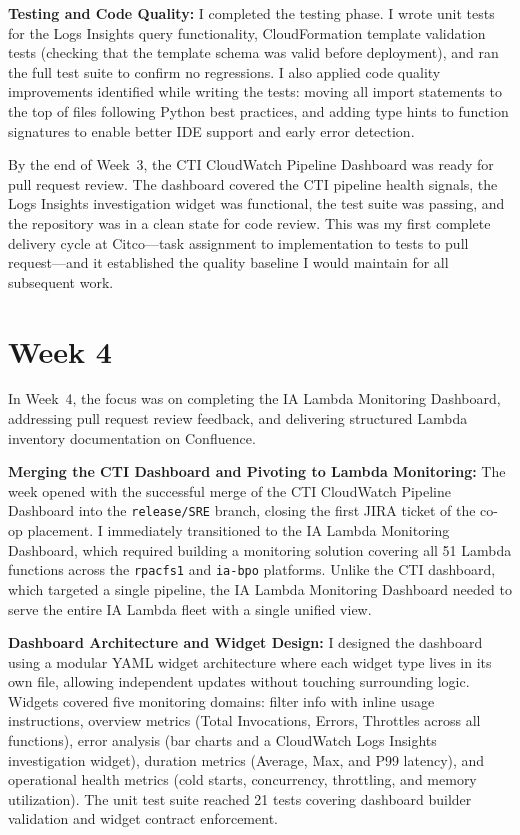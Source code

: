 \textbf{Testing and Code Quality:}
I completed the testing phase. I wrote unit tests for the Logs Insights query functionality, CloudFormation template validation tests (checking that the template schema was valid before deployment), and ran the full test suite to confirm no regressions. I also applied code quality improvements identified while writing the tests: moving all import statements to the top of files following Python best practices, and adding type hints to function signatures to enable better IDE support and early error detection.

By the end of Week~3, the CTI CloudWatch Pipeline Dashboard was ready for pull request review. The dashboard covered the CTI pipeline health signals, the Logs Insights investigation widget was functional, the test suite was passing, and the repository was in a clean state for code review. This was my first complete delivery cycle at Citco---task assignment to implementation to tests to pull request---and it established the quality baseline I would maintain for all subsequent work.


\FloatBarrier

\section{Week 4}
\label{sec:week4}

In Week~4, the focus was on completing the IA Lambda Monitoring Dashboard,
addressing pull request review feedback, and delivering structured Lambda inventory
documentation on Confluence.

\textbf{Merging the CTI Dashboard and Pivoting to Lambda Monitoring:} 
The week opened with the successful merge of the CTI CloudWatch Pipeline Dashboard
into the \texttt{release/SRE} branch, closing the first JIRA ticket of
the co-op placement. I immediately transitioned to the IA Lambda Monitoring Dashboard, which required
building a monitoring solution covering all 51 Lambda functions across
the \texttt{rpacfs1} and \texttt{ia-bpo} platforms. Unlike the CTI
dashboard, which targeted a single pipeline, the IA Lambda Monitoring Dashboard needed to serve
the entire IA Lambda fleet with a single unified view.

\textbf{Dashboard Architecture and Widget Design:} 
I designed the dashboard
using a modular YAML widget architecture where each widget type lives in
its own file, allowing independent updates without touching surrounding
logic. Widgets covered five monitoring domains: filter info with inline
usage instructions, overview metrics (Total Invocations, Errors,
Throttles across all functions), error analysis (bar charts and a
CloudWatch Logs Insights investigation widget), duration metrics
(Average, Max, and P99 latency), and operational health metrics
(cold starts, concurrency, throttling, and memory utilization).
The unit test suite reached 21 tests covering dashboard builder
validation and widget contract enforcement.

